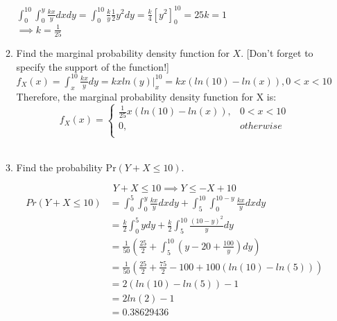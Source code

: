 \documentclass[11pt]{article}
\newcommand{\pr}{\text{Pr}}
\begin{document}
\begin{enumerate}[label=\textbf{Question \arabic*:},start=1]
\begin{enumerate}
	$\displaystyle{ \int_{0}^{10} \int_{0}^{y} \frac{kx}{y} dx dy = \int_{0}^{10} \frac{k}{y} \frac{1}{2} y^2 dy = \frac{k}{4} [y^2]_{0}^{10}= 25k = 1 }$ \\
	$\displaystyle{ \implies k = \frac{1}{25} }$ \\

	\item Find the marginal probability density function for $X$. [Don't forget to specify the support of the function!]\\
	
	$\displaystyle{ f_X(x) = \int_{x}^{10} \frac{kx}{y} dy = kx ln(y)|_{x}^{10} = kx (ln(10) - ln(x)), 0 < x <10 }$\\
	
	Therefore, the marginal probability density function for X is:\\
	$$f_X(x) = \begin{cases}
		\frac{1}{25} x (ln(10) - ln(x)), & 0 < x <10 \\ 
		0, & otherwise\\
		\end{cases}$$\\
	
	\item Find the probability $\pr(Y + X \leq 10)$.
	
	$$Y + X \leq 10 \implies Y \leq -X + 10$$
	\begin{align*}
	Pr(Y + X \leq 10) &= \int_{0}^{5} \int_{0}^{y} \frac{kx}{y} dx dy + \int_{5}^{10} \int_{0}^{10-y} \frac{kx}{y} dx dy \\
	& = \frac{k}{2} \int_{0}^{5} y dy + \frac{k}{2} \int_{5}^{10} \frac{(10-y)^2}{y} dy \\
	& = \frac{1}{50} (\frac{25}{2} + \int_{5}^{10} (y - 20 + \frac{100}{y}) dy) \\
	& = \frac{1}{50} (\frac{25}{2} + \frac{75}{2} - 100 + 100(ln(10) - ln(5))) \\
	& = 2(ln(10) - ln(5)) - 1 \\
	& = 2ln(2) - 1 \\
	& = 0.38629436
	\end{align*}

\end{enumerate}

\end{enumerate}
\end{document}
